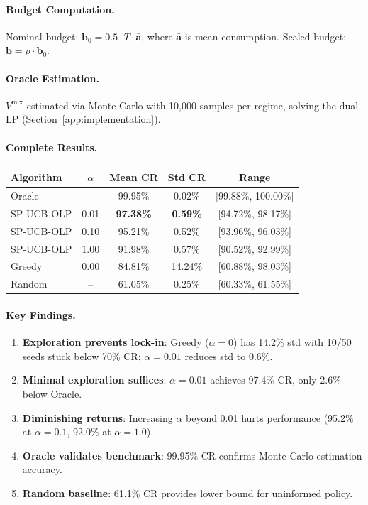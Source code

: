 \documentclass[11pt]{article}
\newcommand{\bb}{\mathbf{b}}
\newcommand{\ba}{\mathbf{a}}
\begin{document}
\paragraph{Budget Computation.}
Nominal budget: $\bb_0 = 0.5 \cdot T \cdot \bar{\ba}$, where $\bar{\ba}$ is mean consumption. Scaled budget: $\bb = \rho \cdot \bb_0$.

\paragraph{Oracle Estimation.}
$V^{\mathrm{mix}}$ estimated via Monte Carlo with 10,000 samples per regime, solving the dual LP (Section~\ref{app:implementation}).

\paragraph{Complete Results.}

\begin{center}
\begin{tabular}{lcccc}
\toprule
Algorithm & $\alpha$ & Mean CR & Std CR & Range \\
\midrule
Oracle & -- & 99.95\% & 0.02\% & [99.88\%, 100.00\%] \\
SP-UCB-OLP & 0.01 & \textbf{97.38\%} & \textbf{0.59\%} & [94.72\%, 98.17\%] \\
SP-UCB-OLP & 0.10 & 95.21\% & 0.52\% & [93.96\%, 96.03\%] \\
SP-UCB-OLP & 1.00 & 91.98\% & 0.57\% & [90.52\%, 92.99\%] \\
Greedy & 0.00 & 84.81\% & 14.24\% & [60.88\%, 98.03\%] \\
Random & -- & 61.05\% & 0.25\% & [60.33\%, 61.55\%] \\
\bottomrule
\end{tabular}
\end{center}

\paragraph{Key Findings.}
\begin{enumerate}
    \item \textbf{Exploration prevents lock-in}: Greedy ($\alpha=0$) has 14.2\% std with 10/50 seeds stuck below 70\% CR; $\alpha=0.01$ reduces std to 0.6\%.
    \item \textbf{Minimal exploration suffices}: $\alpha=0.01$ achieves 97.4\% CR, only 2.6\% below Oracle.
    \item \textbf{Diminishing returns}: Increasing $\alpha$ beyond 0.01 hurts performance (95.2\% at $\alpha=0.1$, 92.0\% at $\alpha=1.0$).
    \item \textbf{Oracle validates benchmark}: 99.95\% CR confirms Monte Carlo estimation accuracy.
    \item \textbf{Random baseline}: 61.1\% CR provides lower bound for uninformed policy.
\end{enumerate}
\end{document}
